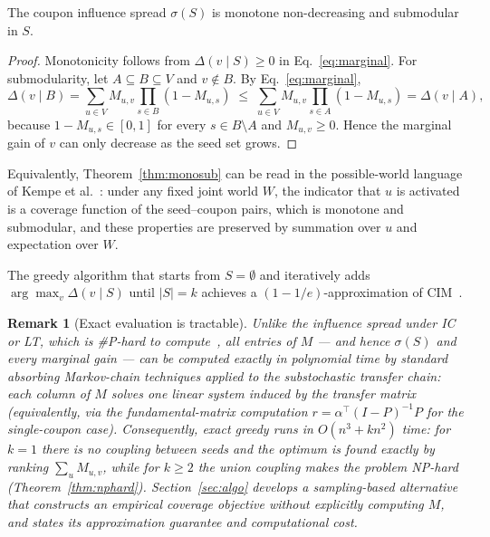 \documentclass[sigconf]{acmart}
\newtheorem{remark}{Remark}[section]
\begin{document}
\begin{theorem}
\label{thm:monosub}
The coupon influence spread $\sigma(S)$ is monotone non-decreasing
and submodular in $S$.
\end{theorem}

\begin{proof}\renewcommand{\qedsymbol}{}
Monotonicity follows from $\Delta(v\mid S)\ge 0$ in
Eq.~\eqref{eq:marginal}.
For submodularity, let $A\subseteq B\subseteq V$ and $v\notin B$.
By Eq.~\eqref{eq:marginal},
\[
\Delta(v\mid B)
=
\sum_{u\in V}M_{u,v}\prod_{s\in B}(1-M_{u,s})
\;\le\;
\sum_{u\in V}M_{u,v}\prod_{s\in A}(1-M_{u,s})
=
\Delta(v\mid A),
\]
because $1-M_{u,s}\in[0,1]$ for every $s\in B\setminus A$ and
$M_{u,v}\ge 0$.
Hence the marginal gain of $v$ can only decrease as the seed set
grows.
\end{proof}

Equivalently, Theorem~\ref{thm:monosub} can be read in the
possible-world language of Kempe et al.~\cite{kempe2003maximizing}:
under any fixed joint world $W$, the indicator that $u$ is activated
is a coverage function of the seed--coupon pairs, which is monotone
and submodular, and these properties are preserved by summation over
$u$ and expectation over $W$.

\begin{corollary}
\label{cor:greedy}
The greedy algorithm that starts from $S=\emptyset$ and iteratively
adds $\arg\max_{v}\Delta(v\mid S)$ until $|S|=k$ achieves a
$(1-1/e)$-approximation of CIM~\cite{nemhauser1978analysis}.
\end{corollary}

\begin{remark}[Exact evaluation is tractable]
\label{rem:tractable-eval}
Unlike the influence spread under IC or LT, which is
\#P-hard to compute~\cite{chen2010scalable}, all entries of $M$ ---
and hence $\sigma(S)$ and every marginal gain --- can be computed
\emph{exactly} in polynomial time by standard absorbing Markov-chain
techniques applied to the substochastic transfer chain: each column
of $M$ solves one linear system induced by the transfer matrix
(equivalently, via the fundamental-matrix computation
$r=\alpha^{\top}(I-P)^{-1}P$ for the single-coupon case).
Consequently, exact greedy runs in $O(n^3+kn^2)$ time: for $k=1$
there is no coupling between seeds and the optimum is found exactly
by ranking $\sum_{u}M_{u,v}$, while for $k\ge 2$ the union coupling
makes the problem NP-hard (Theorem~\ref{thm:nphard}).
Section~\ref{sec:algo} develops a sampling-based alternative that
constructs an empirical coverage objective without explicitly computing
$M$, and states its approximation guarantee and computational cost.
\end{remark}
\end{document}
